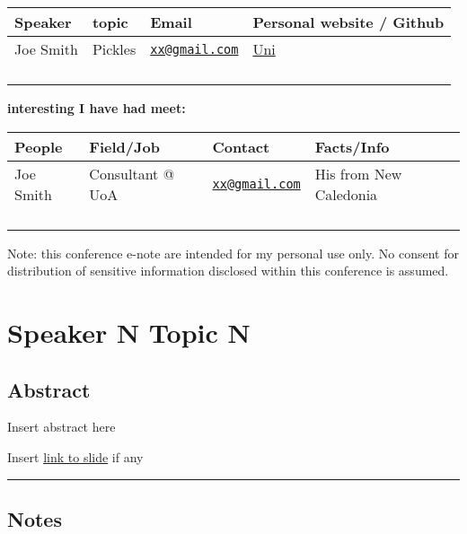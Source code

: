 \documentclass[
]{book}
\begin{document}
\begin{longtable}[]{@{}llll@{}}
\toprule
Speaker & topic & Email & Personal website / Github \\
\midrule
\endhead
Joe Smith & Pickles & \href{mailto:xx@gmail.com}{\nolinkurl{xx@gmail.com}} & \href{www.google.com}{Uni} \\
& & & \\
& & & \\
& & & \\
& & & \\
\bottomrule
\end{longtable}

\textbf{interesting I have had meet:}

\begin{longtable}[]{@{}llll@{}}
\toprule
People & Field/Job & Contact & Facts/Info \\
\midrule
\endhead
Joe Smith & Consultant @ UoA & \href{mailto:xx@gmail.com}{\nolinkurl{xx@gmail.com}} & His from New Caledonia \\
& & & \\
& & & \\
& & & \\
& & & \\
\bottomrule
\end{longtable}

Note: this conference e-note are intended for my personal use only. No consent for distribution of sensitive information disclosed within this conference is assumed.

\hypertarget{speaker-n-topic-n}{%
\chapter{Speaker N Topic N}\label{speaker-n-topic-n}}

\hypertarget{abstract}{%
\section*{Abstract}\label{abstract}}

Insert abstract here

Insert \href{}{link to slide} if any

\begin{center}\rule{0.5\linewidth}{0.5pt}\end{center}

\hypertarget{notes}{%
\section*{Notes}\label{notes}}
\end{document}
